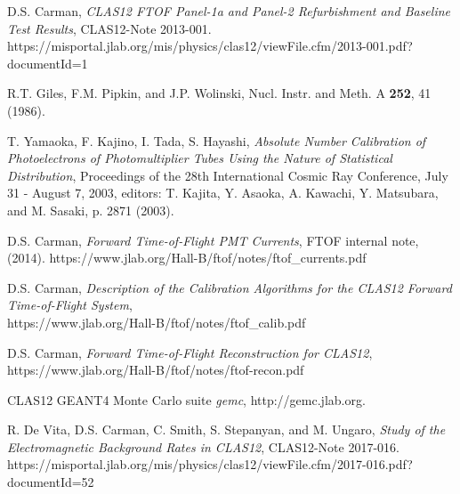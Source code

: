 \documentclass{elsart}
\begin{document}
\begin{thebibliography}{99}
D.S. Carman, {\it CLAS12 FTOF Panel-1a and Panel-2 Refurbishment and Baseline Test Results}, CLAS12-Note 2013-001.\\
https://misportal.jlab.org/mis/physics/clas12/viewFile.cfm/2013-001.pdf?documentId=1

R.T. Giles, F.M. Pipkin, and J.P. Wolinski, Nucl. Instr. and Meth. A {\bf 252}, 41 (1986).

T. Yamaoka, F. Kajino, I. Tada, S. Hayashi, {\it Absolute Number Calibration of Photoelectrons of
Photomultiplier Tubes Using the Nature of Statistical Distribution}, Proceedings of the 28th International
Cosmic Ray Conference, July 31 - August 7, 2003, editors: T. Kajita, Y. Asaoka, A. Kawachi, Y. Matsubara, and
M. Sasaki, p. 2871 (2003).

D.S. Carman, {\it Forward Time-of-Flight PMT Currents}, FTOF internal note, (2014).
https://www.jlab.org/Hall-B/ftof/notes/ftof\_currents.pdf

D.S. Carman, {\it Description of the Calibration Algorithms for the CLAS12 Forward Time-of-Flight System},\\
https://www.jlab.org/Hall-B/ftof/notes/ftof\_calib.pdf

D.S. Carman, {\it Forward Time-of-Flight Reconstruction for CLAS12},\\
https://www.jlab.org/Hall-B/ftof/notes/ftof-recon.pdf

CLAS12 GEANT4 Monte Carlo suite {\it gemc}, http://gemc.jlab.org.

R. De Vita, D.S. Carman, C. Smith, S. Stepanyan, and M. Ungaro, {\it Study of the Electromagnetic Background
Rates in CLAS12}, CLAS12-Note 2017-016.\\
https://misportal.jlab.org/mis/physics/clas12/viewFile.cfm/2017-016.pdf?documentId=52


\end{thebibliography}
\end{document}
